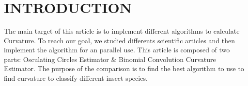 \section{INTRODUCTION}

\paragraph{}
The main target of this article is to implement different algorithms to calculate Curvature. To reach our goal, we studied differents scientific articles \cite{kerautret2008comparison} and then implement the algorithm for an parallel use. \newline This article is composed of two parts: Osculating Circles Estimator \& Binomial Convolution Curvature Estimator.  \newline The purpose of the comparison is to find the best algorithm to use to find curvature to classify different insect species.
